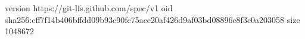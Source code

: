 version https://git-lfs.github.com/spec/v1
oid sha256:cff7f14b406bffdd09b93c90fc75ace20af426d9af03bd08896e8f3c0a203058
size 1048672
